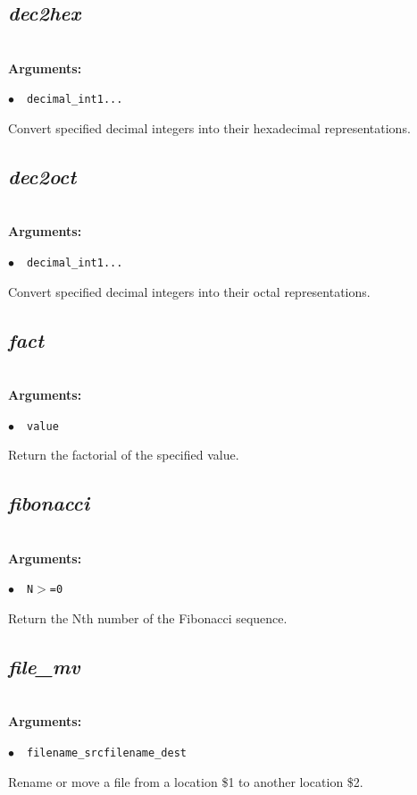 \documentclass[a4paper,10.5pt,twoside]{book}
\def\comma{\discretionary{,}{}{,}}
\newcommand{\Cb}[1]{\textcolor{cb}{#1}}
\begin{document}
\subsection{\emph{dec2hex} }\vspace*{-0.7em}
~\\\textbf{\Cb{Arguments: }}\begin{flushleft}
{\small \Cb{\hspace*{0.5cm}$\bullet$~~\texttt{decimal\_int1{\comma}...}}}\end{flushleft}
Convert specified decimal integers into their hexadecimal representations.


\subsection{\emph{dec2oct} }\vspace*{-0.7em}
~\\\textbf{\Cb{Arguments: }}\begin{flushleft}
{\small \Cb{\hspace*{0.5cm}$\bullet$~~\texttt{decimal\_int1{\comma}...}}}\end{flushleft}
Convert specified decimal integers into their octal representations.


\subsection{\emph{fact} }\vspace*{-0.7em}
~\\\textbf{\Cb{Arguments: }}\begin{flushleft}
{\small \Cb{\hspace*{0.5cm}$\bullet$~~\texttt{value}}}\end{flushleft}
Return the factorial of the specified value.


\subsection{\emph{fibonacci} }\vspace*{-0.7em}
~\\\textbf{\Cb{Arguments: }}\begin{flushleft}
{\small \Cb{\hspace*{0.5cm}$\bullet$~~\texttt{N$>$=0}}}\end{flushleft}
Return the Nth number of the Fibonacci sequence.


\subsection{\emph{file\_mv} }\vspace*{-0.7em}
~\\\textbf{\Cb{Arguments: }}\begin{flushleft}
{\small \Cb{\hspace*{0.5cm}$\bullet$~~\texttt{filename\_src{\comma}filename\_dest}}}\end{flushleft}
Rename or move a file from a location \$1 to another location \$2.
\end{document}
